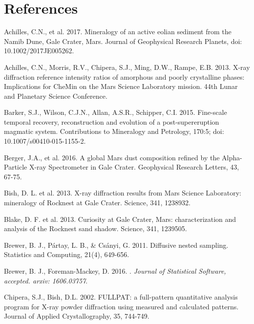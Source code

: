 \documentclass[preprint, a4paper]{elsarticle}
\begin{document}
\section*{References}
\begin{thebibliography}{99}


Achilles, C.N., et al. 2017. Mineralogy of an active eolian sediment from the Namib Dune, Gale Crater, Mars. Journal of Geophysical Research Planets, doi: 10.1002/2017JE005262.

Achilles, C.N., Morris, R.V., Chipera, S.J., Ming, D.W., Rampe, E.B. 2013. X-ray diffraction reference intensity ratios of amorphous and poorly crystalline phases: Implications for CheMin on the Mars Science Laboratory mission. 44th Lunar and Planetary Science Conference.

Barker, S.J., Wilson, C.J.N., Allan, A.S.R., Schipper, C.I. 2015. Fine-scale temporal recovery, reconstruction and evolution of a post-supereruption magmatic system. Contributions to Mineralogy and Petrology, 170:5; doi: 10.1007/s00410-015-1155-2.

Berger, J.A., et al. 2016. A global Mars dust composition refined by the Alpha-Particle X-ray Spectrometer in Gale Crater. Geophysical Research Letters, 43, 67-75.

Bish, D. L. et al. 2013. X-ray diffraction results from Mars Science Laboratory: mineralogy of Rocknest at Gale Crater. Science, 341, 1238932.

Blake, D. F. et al. 2013. Curiosity at Gale Crater, Mars: characterization and analysis of the Rocknest sand shadow. Science, 341, 1239505.

Brewer, B. J., Pártay, L. B., \& Csányi, G. 2011. Diffusive nested sampling. Statistics and Computing, 21(4), 649-656.

Brewer, B. J., Foreman-Mackey, D. 2016.
.
\newblock \emph{Journal of Statistical Software, accepted. arxiv: 1606.03757}.

Chipera, S.J., Bish, D.L. 2002. FULLPAT: a full-pattern quantitative analysis program for X-ray powder diffraction using measured and calculated patterns. Journal of Applied Crystallography, 35, 744-749.


\end{thebibliography}
\end{document}
